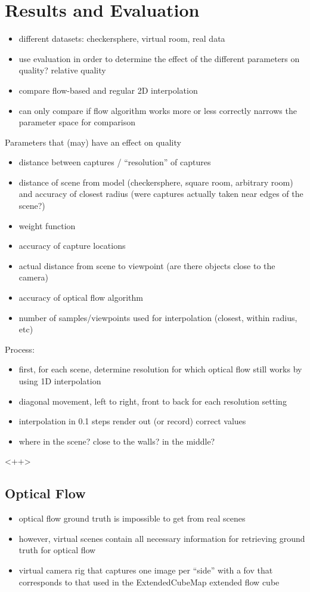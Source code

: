 \chapter{Results and Evaluation}

\begin{itemize}
  \item different datasets: checkersphere, virtual room, real data
  \item use evaluation in order to determine the effect of the different parameters on quality? \ar relative quality
  \item compare flow-based and regular 2D interpolation
  \item can only compare if flow algorithm works more or less correctly \ar narrows the parameter space for comparison
\end{itemize}

Parameters that (may) have an effect on quality
\begin{itemize}
  \item distance between captures / ``resolution'' of captures
  \item distance of scene from model (checkersphere, square room, arbitrary room) and accuracy of closest radius (were captures actually taken near edges of the scene?)
  \item weight function
  \item accuracy of capture locations
  \item actual distance from scene to viewpoint (are there objects close to the camera)
  \item accuracy of optical flow algorithm
  \item number of samples/viewpoints used for interpolation (closest, within radius, etc)
\end{itemize}

Process:
\begin{itemize}
  \item first, for each scene, determine resolution for which optical flow still works by using 1D interpolation 
  \item diagonal movement, left to right, front to back for each resolution setting
  \item interpolation in 0.1 steps \ar render out (or record) correct values
  \item where in the scene? close to the walls? in the middle?
\end{itemize}<++>

\section{Optical Flow}
\begin{itemize}
  \item optical flow ground truth is impossible to get from real scenes
  \item however, virtual scenes contain all necessary information for retrieving ground truth for optical flow
  \item virtual camera rig that captures one image per ``side'' with a fov that corresponds to that used in the ExtendedCubeMap \ar extended flow cube
\end{itemize}

